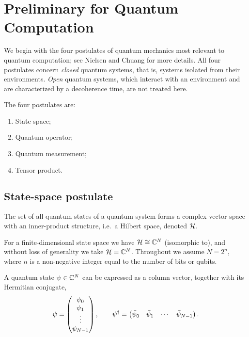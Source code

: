 \chapter{Preliminary for Quantum Computation}\label{ch:sec01}

We begin with the four postulates of quantum mechanics most relevant to quantum
computation; see Nielsen and Chuang for more details. All four postulates
concern \emph{closed} quantum systems, that is, systems isolated from their
environments. \emph{Open} quantum systems, which interact with an environment
and are characterized by a decoherence time, are not treated here.

The four postulates are:
\begin{enumerate}
  \item State space;
  \item Quantum operator;
  \item Quantum measurement;
  \item Tensor product.
\end{enumerate}

\section{State-space postulate}\label{sec:sec01-state-space}

\begin{definition}
The set of all quantum states of a quantum system forms a complex vector space
with an inner-product structure, i.e.\ a Hilbert space, denoted $\mathcal{H}$.
\end{definition}

For a finite-dimensional state space we have $\mathcal{H} \cong \mathbb{C}^N$ (isomorphic to),
and without loss of generality we take $\mathcal{H} = \mathbb{C}^N$. Throughout we assume
$N = 2^n$, where $n$ is a non-negative integer equal to the number of bits or
qubits.

A quantum state $\psi \in \mathbb{C}^N$ can be expressed as a column vector, together
with its Hermitian conjugate,
\begin{equation}
  \psi = \begin{pmatrix} \psi_0 \\ \psi_1 \\ \vdots \\ \psi_{N-1} \end{pmatrix},
  \qquad
  \psi^{\dagger} = \begin{pmatrix} \bar{\psi}_0 & \bar{\psi}_1 & \cdots & \bar{\psi}_{N-1} \end{pmatrix}.
\end{equation}

